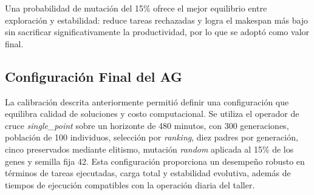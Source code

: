 \begin{table}[htbp]
\centering
\small
\caption{Resultados promedio del AG para diferentes probabilidades de mutación (480 minutos).}
\label{tab:mutacion-resultados-480}
\end{table}

Una probabilidad de mutación del 15\% ofrece el mejor equilibrio entre exploración y estabilidad: reduce tareas rechazadas y logra el makespan más bajo sin sacrificar significativamente la productividad, por lo que se adoptó como valor final.

\subsection{Configuración Final del AG}
\label{tab:config-final-ag}

La calibración descrita anteriormente permitió definir una configuración que equilibra calidad de soluciones y costo computacional. Se utiliza el operador de cruce \textit{single\_point} sobre un horizonte de 480 minutos, con 300 generaciones, población de 100 individuos, selección por \textit{ranking}, diez padres por generación, cinco preservados mediante elitismo, mutación \textit{random} aplicada al 15\% de los genes y semilla fija 42. Esta configuración proporciona un desempeño robusto en términos de tareas ejecutadas, carga total y estabilidad evolutiva, además de tiempos de ejecución compatibles con la operación diaria del taller.

\begin{table}[H]
\centering
\small
\caption{Configuración final del algoritmo genético empleada en las simulaciones.}
\end{table}

